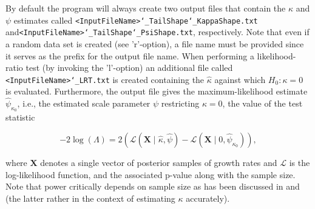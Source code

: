 \documentclass[12pt,a4paper]{scrartcl}
\begin{document}
By default the program will always create two output files that contain the $\kappa$ and $\psi$ estimates called \texttt{<InputFileName>\char`_TailShape\char`_KappaShape.txt} and\newline \texttt{<InputFileName>\char`_TailShape\char`_PsiShape.txt}, respectively. Note that even if a random data set is created (see 'r'-option), a file name must be provided since it serves as the prefix for the output file name.
When performing a likelihood-ratio test (by invoking the 'l'-option) an additional file called \texttt{<InputFileName>\char`_LRT.txt} is created containing the $\hat{\kappa}$ against which $H_0: \kappa=0$ is evaluated. Furthermore, the output file gives the maximum-likelihood estimate $\hat{\psi}_{\kappa_0}$, i.e., the estimated scale parameter $\psi$ restricting $\kappa=0$, the value of the test statistic

\begin{equation}
-2\log(\Lambda)=2(\mathcal{L}(\mathbf{X}\mid \hat{\kappa}, \hat{\psi})-\mathcal{L}(\mathbf{X}\mid 0, \hat{\psi}_{\kappa_0})),
\end{equation}

where $\mathbf{X}$ denotes a single vector of posterior samples of growth rates and $\mathcal{L}$ is the log-likelihood function, and the associated p-value along with the sample size.
Note that power critically depends on sample size as has been discussed in \cite{BeiRW07} and \cite{CasS15} (the latter rather in the context of estimating $\kappa$ accurately).

\clearpage

 
\end{document}
